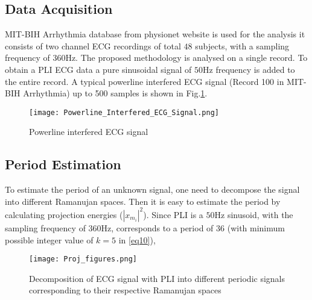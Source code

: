 \documentclass[conference]{IEEEtran}
\begin{document}
\subsection{Data Acquisition}
MIT-BIH Arrhythmia database from physionet website \cite{Physionet} is used for the analysis it consists of two channel ECG recordings of total $48$ subjects, with a sampling frequency of $360$Hz. 
The proposed methodology is analysed on a single record. To obtain a PLI ECG data a pure sinusoidal signal of $50$Hz frequency is added to the entire record. A typical powerline interfered ECG signal (Record 100 in MIT-BIH Arrhythmia) up to 500 samples is shown in Fig.\ref{Powerline interfered ECG signal}.   
\begin{figure}[!h]
\centering
\texttt{[image: Powerline\_Interfered\_ECG\_Signal.png]} 
\caption[Powerline interfered ECG signal]{Powerline interfered ECG signal}
	\label{Powerline interfered ECG signal}
\end{figure}
\subsection{Period Estimation}
To estimate the period of an unknown signal, one need to decompose the signal into different Ramanujan spaces. Then it is easy to estimate the period by calculating projection energies ($|x_{m_i}|^2$). Since PLI is a $50$Hz sinusoid, with the sampling frequency of $360$Hz, corresponds to a period of $36$ (with minimum possible integer value of $k = 5$ in  \eqref{eq10}), 
\begin{figure}[!h]
\centering
 \texttt{[image: Proj\_figures.png]} 
\caption[Decomposition of ECG signal with PLI into different periodic signals corresponding to their respective Ramanujan spaces]{Decomposition of ECG signal with PLI into different periodic signals corresponding to their respective Ramanujan spaces}
\label{Decomposition of ECG signal with PLI into different periodic signals corresponding to their respective Ramanujan spaces}
\end{figure}
\end{document}

